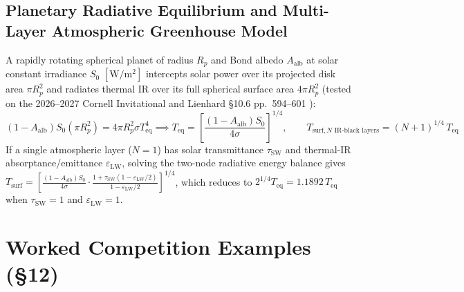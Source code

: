 \subsection{Planetary Radiative Equilibrium and Multi-Layer Atmospheric Greenhouse Model}
A rapidly rotating spherical planet of radius $R_p$ and Bond albedo $A_{\mathrm{alb}}$ at solar constant irradiance $S_0$ $[\si{\watt\per\square\meter}]$ intercepts solar power over its projected disk area $\pi R_p^2$ and radiates thermal IR over its full spherical surface area $4\pi R_p^2$ (tested on the 2026--2027 Cornell Invitational  and Lienhard §10.6 pp.~594--601 ):
\begin{equation}
  (1 - A_{\mathrm{alb}}) S_0 \left(\pi R_p^2\right) = 4\pi R_p^2 \sigma T_{\mathrm{eq}}^4 \implies T_{\mathrm{eq}} = \left[\frac{(1 - A_{\mathrm{alb}}) S_0}{4\sigma}\right]^{1/4}, \qquad T_{\mathrm{surf}, N\text{ IR-black layers}} = (N + 1)^{1/4}\,T_{\mathrm{eq}}
  \label{eq:12:planetary-eq}
\end{equation}
If a single atmospheric layer ($N=1$) has solar transmittance $\tau_{\mathrm{SW}}$ and thermal-IR absorptance/emittance $\varepsilon_{\mathrm{LW}}$, solving the two-node radiative energy balance gives $T_{\mathrm{surf}} = \left[\frac{(1-A_{\mathrm{alb}})S_0}{4\sigma}\cdot\frac{1 + \tau_{\mathrm{SW}}(1 - \varepsilon_{\mathrm{LW}}/2)}{1 - \varepsilon_{\mathrm{LW}}/2}\right]^{1/4}$, which reduces to $2^{1/4}T_{\mathrm{eq}} = 1.1892\,T_{\mathrm{eq}}$ when $\tau_{\mathrm{SW}}=1$ and $\varepsilon_{\mathrm{LW}}=1$.

\section{Worked Competition Examples (§12)}
\label{sec:12.3}

